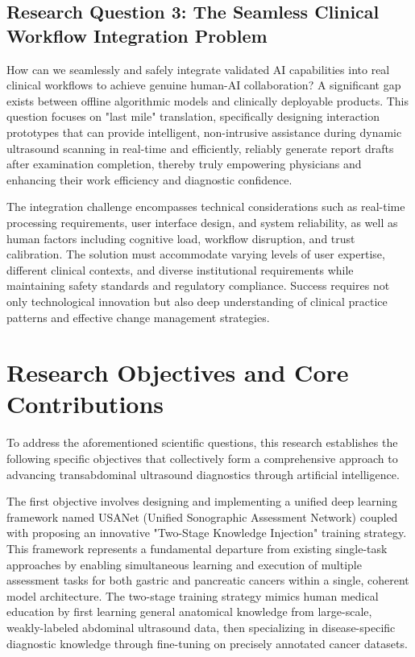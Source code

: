 \subsection{Research Question 3: The Seamless Clinical Workflow Integration Problem}

How can we seamlessly and safely integrate validated AI capabilities into real clinical workflows to achieve genuine human-AI collaboration? A significant gap exists between offline algorithmic models and clinically deployable products. This question focuses on "last mile" translation, specifically designing interaction prototypes that can provide intelligent, non-intrusive assistance during dynamic ultrasound scanning in real-time and efficiently, reliably generate report drafts after examination completion, thereby truly empowering physicians and enhancing their work efficiency and diagnostic confidence.

The integration challenge encompasses technical considerations such as real-time processing requirements, user interface design, and system reliability, as well as human factors including cognitive load, workflow disruption, and trust calibration. The solution must accommodate varying levels of user expertise, different clinical contexts, and diverse institutional requirements while maintaining safety standards and regulatory compliance. Success requires not only technological innovation but also deep understanding of clinical practice patterns and effective change management strategies.

\section{Research Objectives and Core Contributions}

To address the aforementioned scientific questions, this research establishes the following specific objectives that collectively form a comprehensive approach to advancing transabdominal ultrasound diagnostics through artificial intelligence.

The first objective involves designing and implementing a unified deep learning framework named USANet (Unified Sonographic Assessment Network) coupled with proposing an innovative "Two-Stage Knowledge Injection" training strategy. This framework represents a fundamental departure from existing single-task approaches by enabling simultaneous learning and execution of multiple assessment tasks for both gastric and pancreatic cancers within a single, coherent model architecture. The two-stage training strategy mimics human medical education by first learning general anatomical knowledge from large-scale, weakly-labeled abdominal ultrasound data, then specializing in disease-specific diagnostic knowledge through fine-tuning on precisely annotated cancer datasets.

